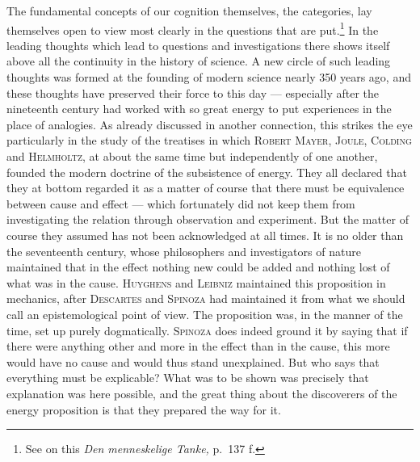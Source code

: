 \documentclass[12pt]{book}
\newcommand{\opage}[1]{\marginnote{\footnotesize\textit{[#1]}}}
\begin{document}
\opage{100}The fundamental concepts of our cognition themselves, the categories, lay
themselves open to view most clearly in the questions that are
put.\footnote{See on this \textit{Den menneskelige Tanke,} p.\ 137 f.} In the
leading thoughts which lead to questions and investigations there shows itself
above all the continuity in the history of science. A new circle of such leading
thoughts was formed at the founding of modern science nearly 350 years ago, and
these thoughts have preserved their force to this day --- especially after the
nineteenth century had worked with so great energy to put experiences in the place
of analogies. As already discussed in another connection, this strikes the eye
particularly in the study of the treatises in which \textsc{Robert Mayer, Joule,
Colding} and \textsc{Helmholtz}, at about the same time but independently of one
another, founded the modern doctrine of the subsistence of energy. They all
declared that they at bottom regarded it as a matter of course that there must be
equivalence between cause and effect --- which fortunately did not keep them from
investigating the relation through observation and experiment. But the matter of
course they assumed has not been acknowledged at all times. It is no older than
the seventeenth century, whose philosophers and investigators of nature maintained
that in the effect nothing new could be added and nothing lost of what was in the
cause. \textsc{Huyghens} and \textsc{Leibniz} maintained this proposition in
mechanics, after \textsc{Descartes} and \textsc{Spinoza} had maintained it from
what we should call an epistemological point of view. The proposition was, in the
manner of the time, set up purely dogmatically. \textsc{Spinoza} does indeed
ground it by saying that if there were anything other and more in the effect than
in the cause, this more would have no cause and would thus stand unexplained. But
who says that everything must be explicable? What was to be shown was precisely
that explanation \opage{101}was here possible, and the great thing about the discoverers of
the energy proposition is that they prepared the way for it.
\end{document}
